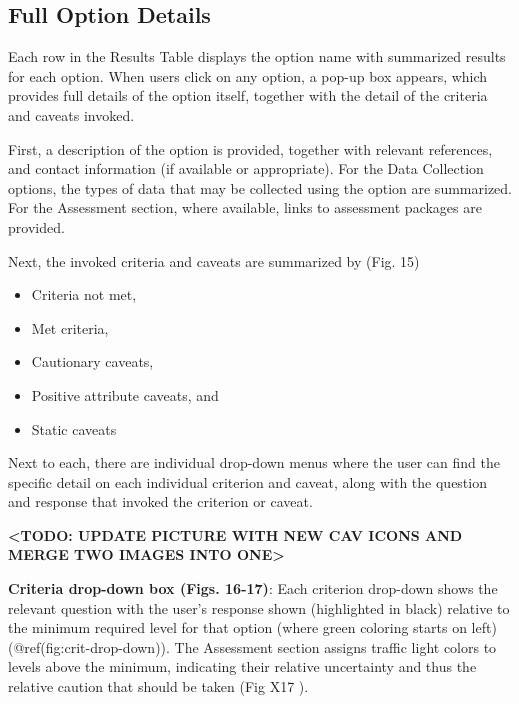\documentclass[11pt,]{book}
\providecommand{\tightlist}{%
  \setlength{\itemsep}{0pt}\setlength{\parskip}{0pt}}
\begin{document}
\hypertarget{full-option-details}{%
\subsection{Full Option Details}\label{full-option-details}}

Each row in the Results Table displays the option name with summarized
results for each option. When users click on any option, a pop-up box
appears, which provides full details of the option itself, together with
the detail of the criteria and caveats invoked.

First, a description of the option is provided, together with relevant
references, and contact information (if available or appropriate). For
the Data Collection options, the types of data that may be collected
using the option are summarized. For the Assessment section, where
available, links to assessment packages are provided.

Next, the invoked criteria and caveats are summarized by (Fig. 15)

\begin{itemize}
\tightlist
\item
  Criteria not met,
\item
  Met criteria,
\item
  Cautionary caveats,
\item
  Positive attribute caveats, and
\item
  Static caveats
\end{itemize}

Next to each, there are individual drop-down menus where the user can
find the specific detail on each individual criterion and caveat, along
with the question and response that invoked the criterion or caveat.

\textbf{\textless TODO: UPDATE PICTURE WITH NEW CAV ICONS AND MERGE TWO
IMAGES INTO ONE\textgreater{}}

\textbf{Criteria drop-down box (Figs. 16-17)}: Each criterion drop-down
shows the relevant question with the user's response shown (highlighted
in black) relative to the minimum required level for that option (where
green coloring starts on left) (@ref(fig:crit-drop-down)). The
Assessment section assigns traffic light colors to levels above the
minimum, indicating their relative uncertainty and thus the relative
caution that should be taken (Fig X17 ).
\end{document}
